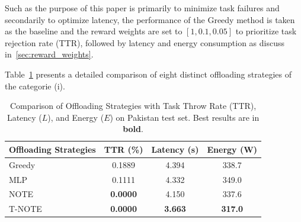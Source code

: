 \documentclass[preprint,3p,authoryear]{elsarticle}
\begin{document}
Such as the purpose of this paper is primarily to minimize task failures and secondarily to optimize latency, the performance of the Greedy method is taken as the baseline and the reward weights are set to \([1, 0.1, 0.05]\) to prioritize task rejection rate (TTR), followed by latency and energy consumption as discuss in~\ref{sec:reward_weights}.

Table~\ref{tab:results_comparison} presents a detailed comparison of eight distinct offloading strategies of the categorie (i). 

\begin{table}[htbp]
\centering

\begin{tabular}{lccc}
\textbf{Offloading Strategies} & \textbf{TTR (\%)} & \textbf{Latency (s)} & \textbf{Energy (W)} \\
\hline
 
Greedy 
 & 0.1889
 & 4.394
 & 338.7 \\

\hline
 
MLP 
 & 0.1111
 & 4.332
 & 349.0 \\
 
NOTE 
 & \textbf{0.0000} 
 & 4.150
 & 337.6 \\
 
T-NOTE 
 & \textbf{0.0000} 
 & \textbf{3.663} 
 & \textbf{317.0} \\

\end{tabular}

\caption{Comparison of Offloading Strategies with Task Throw Rate (TTR), Latency (\(L\)), and Energy (\(E\)) on Pakistan test set.
Best results are in \textbf{bold}.}
\label{tab:results_comparison}
\end{table}
\end{document}
